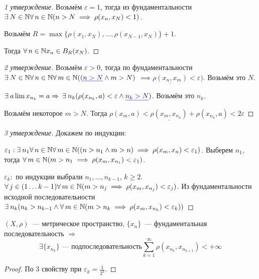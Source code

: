 \documentclass[document]{subfiles}
\begin{document}
\begin{proof}[1 утверждение]
    Возьмём $\varepsilon = 1$, тогда из фундаментальности $\exists N \in \bN \forall n \in \bN (n > N \implies \rho (x_n, x_N) < 1)$.

    Возьмём $R = \max \{ \rho(x_1, x_N), \ldots, \rho(x_{N-1},x_{N}) \} + 1$.
        
    Тогда $\forall n \in \bN x_n \in B_R(x_N)$.
\end{proof}
\begin{proof}[2 утверждение]
    Возьмём $\varepsilon > 0$, тогда по фундаментальности $\exists N \in \bN \forall n \in \bN \forall m \in \bN ((\textcolor{blue}{\underline{n > N}} \land  m > N) $ $\implies \underline{\rho(x_n, x_m)} < \varepsilon)$. Возьмём это $N$.

    $\exists a \liml x_{n_k} = a \Rightarrow \: \exists n_k (\rho(x_{n_k}, a) < \varepsilon \land \textcolor{blue}{\underline{n_k > N}})$. Возьмём это $n_k$.

    Возьмём некоторое $m > N$. Тогда $\rho(x_m, a) < \underline{\rho(x_m, x_{n_k})} + \rho(x_{n_k}, a) < 2 \varepsilon$
\end{proof}
\begin{proof}[3 утверждение]
    Докажем по индукции:

    $\varepsilon_1: \exists n_1 \forall n \in \bN \forall m \in \bN ((n > n_1 \land m > n) \implies \rho(x_m,x_n) < \varepsilon_1)$. Выберем $n_1$, тогда $\forall m \in \bN (m > n_1 \implies \rho(x_m, x_{n_1}) < \varepsilon_1)$.

    $\varepsilon_k:$ по индукции выбрали $n_1, \ldots, n_{k-1}$, $k \geq 2$. $\forall j \in ( 1 \ldots k-1 ) \forall m \in \bN (m > n_j \implies \rho (x_m, x_{n_j}) < \varepsilon_j)$.
    Из фундаментальности исходной последовательности $\exists n_k (n_k > n_{k-1} \land \forall m \in \bN (m > n_k \implies \rho (x_m, x_{n_k}) < \varepsilon_k))$
\end{proof}

\begin{corollary}
\label{cor:subseq-metric-sum-converges}
    $(X, \rho)$~--- метрическое пространство, $\{x_n\}$~--- фундаментальная последовательность $\Rightarrow$
    \[ \exists \{x_{n_k} \} \text {~--- подпоследовательность} \sum_{k=1}^\infty \rho(x_{n_k}, x_{n_{k+1}}) < + \infty \]
\end{corollary}
\begin{proof}
    По 3 свойству при $\varepsilon_k = \frac{1}{2^k}$.
\end{proof}
\end{document}
